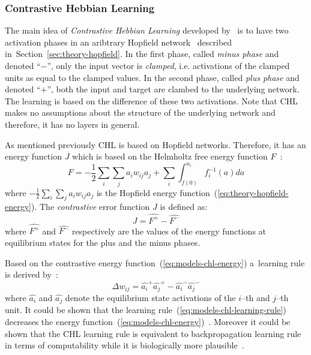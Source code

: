 
\subsubsection{Contrastive Hebbian Learning}
\label{sec:models-chl} 

The main idea of \emph{Contrastive Hebbian Learning} developed by~\citet{movellan1990contrastive} is to have two activation phases in an aribtrary Hopfield network~\citep{hopfield1984neurons} described in~Section~\ref{sec:theory-hopfield}. In the first phase, called \emph{minus phase} and denoted ``$-$'', only the input vector is \emph{clamped}, i.e. activations of the clamped units as equal to the clamped values. In the second phase, called \emph{plus phase} and denoted ``$+$'', both the input and target are clambed to the underlying network. The learning is based on the difference of these two activations. Note that CHL makes no assumptions about the structure of the underlying network and therefore, it has no layers in general. 

\newpage
As mentioned previously CHL is based on Hopfield networks. Therefore, it has an energy function $J$ which is based on the Helmholtz free energy function $F$~\citep{hinton1989deterministic}:
\begin{equation}
  \label{eq:models-chl-helmholtz}
  F = -\frac{1}{2}\sum_i\sum_ja_iw_{ij}a_j + \sum_i \int_{f(0)}^{a_i} f_i^{-1}(a)da
\end{equation} 
where $-\frac{1}{2}\sum_i\sum_ja_iw_{ij}a_j$ is the Hopfield energy function~(\ref{eq:theory-hopfield-energy}). The \emph{contrastive} error function $J$ is defined as: 
\begin{equation}
  \label{eq:models-chl-energy}
  J = \hat{F^{+}} - \hat{F^{-}}
\end{equation} 
where $\hat{F^{+}}$ and $\hat{F^{-}}$ respectively are the values of the energy functions at equilibrium states for the plus and the minus phases. 

Based on the contrastive energy function~(\ref{eq:models-chl-energy}) a~learning rule is derived by~\citet{movellan1990contrastive}: 
\begin{equation}
  \label{eq:models-chl-learning-rule}
  \Delta w_{ij} = \hat{a_i}^{+}\hat{a_j}^{+} - \hat{a_i}^{-}\hat{a_j}^{-}
\end{equation}
where $\hat{a_i}$ and $\hat{a_j}$ denote the equilibrium state activations of the $i$--th and $j$--th unit. It could be shown that the learning rule~(\ref{eq:models-chl-learning-rule}) decreases the energy function~(\ref{eq:models-chl-energy})~\citep{movellan1990contrastive}. Moreover it could be shown that the CHL learning rule is equivalent to backpropagation learning rule in terms of computability while it is biologically more plausible~\citep{o1996bio, xie2003equivalence}. 

   
